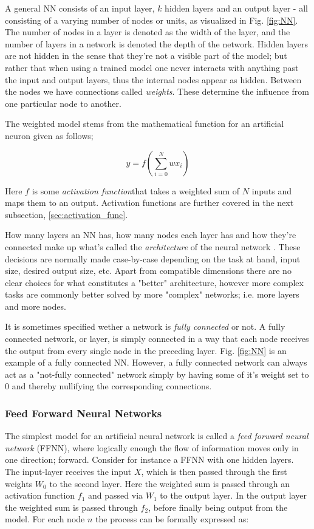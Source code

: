 A general NN consists of an input layer, $k$ hidden layers and an output layer - all consisting of a varying number of nodes or units, as visualized in Fig. \ref{fig:NN}. The number of nodes in a layer is denoted as the width of the layer, and the number of layers in a network is denoted the depth of the network. 
Hidden layers are not hidden in the sense that they're not a visible part of the model; but rather that when using a trained model one never interacts with anything past the input and output layers, thus the internal nodes appear as hidden. 
Between the nodes we have connections called \textit{weights}. These determine the influence from one particular node to another. 

The weighted model stems from the mathematical function for an artificial neuron given as follows; 

\begin{equation}\label{artifical_neuron}
    y = f\left( \sum_{i=0}^Nwx_i \right) 
\end{equation}

Here $f$ is some \textit{activation function}that takes a weighted sum of $N$ inputs and maps them to an output. Activation functions are further covered in the next subsection, \ref{sec:activation_func}.

How many layers an NN has, how many nodes each layer has and how they're connected make up what's called the \textit{architecture} of the neural network \citep[Ch.1]{nielsen}. These decisions are normally made case-by-case depending on the task at hand, input size, desired output size, etc. Apart from compatible dimensions there are no clear choices for what constitutes a "better" architecture, however more complex tasks are commonly better solved by more "complex" networks; i.e. more layers and more nodes. 


It is sometimes specified wether a network is \textit{fully connected} or not. A fully connected network, or layer, is simply connected in a way that each node receives the output from every single node in the preceding layer. Fig. \ref{fig:NN} is an example of a fully connected NN. However, a fully connected network can always act as a "not-fully connected" network simply by having some of it's weight set to $0$ and thereby nullifying the corresponding connections. 

\subsubsection{Feed Forward Neural Networks}\label{sec:nn}
The simplest model for an artificial neural network is called a \textit{feed forward neural network} (FFNN), where logically enough the flow of information moves only in one direction; forward. Consider for instance a FFNN with one hidden layers. The input-layer receives the input $X$, which is then passed through the first weights $W_0$ to the second layer. Here the weighted sum is passed through an activation function $f_1$ and passed via $W_1$ to the output layer. In the output layer the weighted sum is passed through $f_2$, before finally being output from the model. 
For each node $n$ the process can be formally expressed as:


